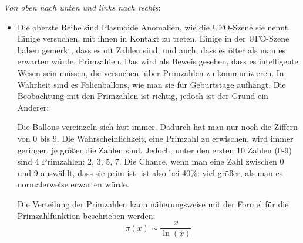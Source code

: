\documentclass{scrartcl}
\begin{document}
\textit{Von oben nach unten und links nach rechts}:

\begin{itemize}
    \item Die oberste Reihe sind \frq Plasmoide Anomalien\flq, wie die UFO-Szene sie nennt. Einige versuchen, mit ihnen in Kontakt zu treten. Einige in der UFO-Szene haben gemerkt, dass es oft Zahlen sind, und auch, dass es öfter als man es erwarten würde, Primzahlen. Das wird als Beweis gesehen, dass es intelligente Wesen sein müssen, die versuchen, über Primzahlen zu kommunizieren. In Wahrheit sind es Folienballons, wie man sie für Geburtstage aufhängt. Die Beobachtung mit den Primzahlen ist richtig, jedoch ist der Grund ein Anderer:

    Die Ballons vereinzeln sich fast immer. Dadurch hat man nur noch die Ziffern von 0 bis 9. Die Wahrscheinlichkeit, eine Primzahl zu \frq erwischen\flq, wird immer geringer, je größer die Zahlen sind. Jedoch, unter den ersten 10 Zahlen (0-9) sind 4 Primzahlen: 2, 3, 5, 7. Die Chance, wenn man eine Zahl zwischen 0 und 9 auswählt, dass sie prim ist, ist also bei 40\%: viel größer, als man es normalerweise erwarten würde.

    Die Verteilung der Primzahlen kann näherungsweise mit der Formel für die Primzahlfunktion beschrieben werden:
    \[
    \pi(x) \sim \frac{x}{\ln(x)}
    \]

    \loadedtable

    \loadedtablelarge


\end{itemize}
\end{document}
